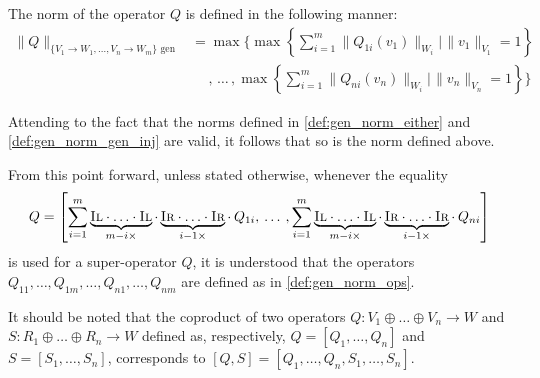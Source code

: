 \begin{definition}
  The norm of the operator $Q$ is defined in the following manner:
  \begin{equation}
    \begin{split}
    \|Q\|_{\{V_1\rightarrow W_1, \ldots, V_n\rightarrow W_m\} \text{ gen}} & =  \max \Bigg\{ \max \left\{ \sum_{i=1}^{m} \|Q_{1i} (v_1)\|_{W_i} | \hspace{1pt} \|v_1\|_{V_1} =1 \right\} \\ 
    & \hspace{15pt},\hspace{2pt} \ldots  \hspace{2pt}, \max \left\{ \sum_{i=1}^{m} \|Q_{ni} (v_n)\|_{W_i}  | \hspace{1pt}  \|v_n\|_{V_n} =1 \right\} \Bigg\}
    \end{split}
  \end{equation}
\end{definition}
Attending to the fact that the norms defined in  \autoref{def:gen_norm_either} and \autoref{def:gen_norm_gen_inj}  are valid, it follows that so is the norm defined above.

\begin{convention}
  From this point forward, unless stated otherwise, whenever the equality 
  $$Q= \left[ \sum_{i=1}^{m} \underbrace{\textsc{Il} \cdot \ldots \cdot \textsc{Il}}_{m-i \times } \cdot  \underbrace{\textsc{Ir} \cdot \ldots \cdot \textsc{Ir}}_{i-1 \times } \cdot  \hspace{2pt} Q_{1i},  \hspace{2pt} \ldots  \hspace{2pt}, \sum_{i=1}^{m} \underbrace{\textsc{Il} \cdot \ldots \cdot \textsc{Il}}_{m-i \times } \cdot  \underbrace{\textsc{Ir} \cdot \ldots \cdot \textsc{Ir}}_{i-1 \times } \cdot  \hspace{2pt} Q_{ni}  \right]$$
   is used for a super-operator $Q$, it is understood that the operators $Q_{11}, \ldots, Q_{1m}, \ldots, Q_{n1}, \ldots, Q_{nm}$ are defined as in \autoref{def:gen_norm_ops}.
\end{convention}

It should be noted that the coproduct of two operators $Q: V_1 \oplus \ldots \oplus V_n \rightarrow W$ and $S: R_1 \oplus \ldots \oplus R_n \rightarrow W$ defined as, respectively, $Q = [Q_1, \ldots, Q_n]$ and $S = [S_1, \ldots, S_n]$, corresponds to $[Q,S] = [Q_1, \ldots, Q_n, S_1, \ldots, S_n]$.

